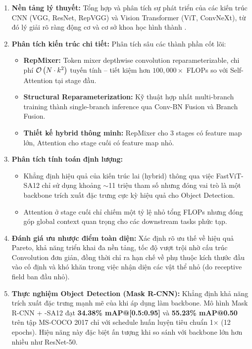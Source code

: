 \begin{enumerate}
    \item \textbf{Nền tảng lý thuyết:} Tổng hợp và phân tích sự phát triển của các kiến trúc CNN (VGG, ResNet, RepVGG) và Vision Transformer (ViT, ConvNeXt), từ đó lý giải rõ ràng động cơ và cơ sở khoa học hình thành \fastvit{}.
    
    \item \textbf{Phân tích kiến trúc chi tiết:} Phân tích sâu các thành phần cốt lõi:
    \begin{itemize}
        \item \textbf{RepMixer:} Token mixer depthwise convolution reparameterizable, chi phí $\mathcal{O}\left(N \cdot k^2\right)$ tuyến tính -- tiết kiệm hơn $100{,}000\times$ FLOPs so với Self-Attention tại stage đầu.
        \item \textbf{Structural Reparameterization:} Kỹ thuật hợp nhất multi-branch training thành single-branch inference qua Conv-BN Fusion và Branch Fusion.
        \item \textbf{Thiết kế hybrid thông minh:} RepMixer cho 3 stages có feature map lớn, Attention cho stage cuối có feature map nhỏ.
    \end{itemize}
    
    \item \textbf{Phân tích tính toán định lượng:} 
    \begin{itemize}
        \item Khẳng định hiệu quả của kiến trúc lai (hybrid) thông qua việc FastViT-SA12 chỉ sử dụng khoảng $\sim$11 triệu tham số nhưng đóng vai trò là một backbone trích xuất đặc trưng cực kỳ hiệu quả cho Object Detection.
        \item Attention ở stage cuối chỉ chiếm một tỷ lệ nhỏ tổng FLOPs nhưng đóng góp global context quan trọng cho các downstream tasks phức tạp.
    \end{itemize}
    
    \item \textbf{Đánh giá ưu nhược điểm toàn diện:} Xác định rõ ưu thế về hiệu quả Pareto, khả năng triển khai đa nền tảng, tốc độ vượt trội nhờ cấu trúc Convolution đơn giản, đồng thời chỉ ra hạn chế về phụ thuộc kích thước đầu vào cố định và khó khăn trong việc nhận diện các vật thể nhỏ (do receptive field ban đầu nhỏ).
    
    \item \textbf{Thực nghiệm Object Detection (Mask R-CNN):} Khẳng định khả năng trích xuất đặc trưng mạnh mẽ của \fastvit{} khi áp dụng làm backbone. Mô hình Mask R-CNN + \fastvit{}-SA12 đạt \textbf{34.38\% mAP@[0.5:0.95]} và \textbf{55.23\% mAP@0.50} trên tập MS-COCO 2017 chỉ với schedule huấn luyện tiêu chuẩn 1$\times$ (12 epochs). Hiệu năng này đặc biệt ấn tượng khi so sánh với backbone lớn hơn nhiều như ResNet-50.
\end{enumerate}


